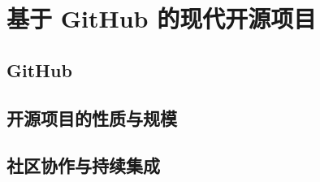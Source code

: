 \documentclass[../main.tex]{subfiles}
\begin{document}
\section{基于 GitHub 的现代开源项目}

\subsection{GitHub}

\subsection{开源项目的性质与规模}

\subsection{社区协作与持续集成}
\end{document}
